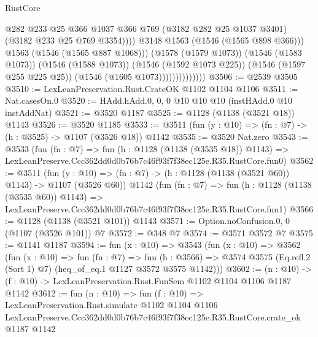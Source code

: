 \begin{lexlean}{RustCore}
\begin{coremodule}
                                      @282
                                      @233
                                      @25
                                      @366
                                      @1037
                                      @366
                                      @769
                                      (@3182 @282 @25 @1037 @3401)
                                      (@3182 @233 @25 @769 @3354))))
                                @3148
                                @1563
                                (@1546 (@1565 @898 @366)))
                              @1563
                              (@1546 (@1565 @887 @1068)))
                            (@1578 (@1579 @1073))
                            (@1546 (@1583 @1073))
                            (@1546 (@1588 @1073))
                            (@1546 (@1592 @1073 @225))
                            (@1546 (@1597 @255 @225 @25))
                            (@1546 (@1605 @1073))))))))))))))
@3506 := @2539 @3505
@3510 := LexLeanPreservation.Rust.CrateOK @1102 @1104 @1106
@3511 := Nat.casesOn.{0}
@3520 := HAdd.hAdd.{0, 0, 0} @10 @10 @10 (instHAdd.{0} @10 instAddNat)
@3521 := @3520 @1187
@3525 := @1128 (@1138 (@3521 @18)) @1143
@3526 := @3520 @1185
@3533 := @3511 (fun (y : @10) => (fn : @7) -> (h : @3525) -> @1107 (@3526 @18)) @1142
@3535 := @3520 Nat.zero
@3543 := @3533
    (fun (fn : @7) =>
    fun (h : @1128 (@1138 (@3535 @18)) @1143) =>
    LexLeanPreserve.Ccc362dd0d0b76b7c46f93f7f38ec125e.R35.RustCore.fun0)
@3562 := @3511
    (fun (y : @10) => (fn : @7) -> (h : @1128 (@1138 (@3521 @60)) @1143) -> @1107 (@3526 @60))
    @1142
    (fun (fn : @7) =>
    fun (h : @1128 (@1138 (@3535 @60)) @1143) =>
    LexLeanPreserve.Ccc362dd0d0b76b7c46f93f7f38ec125e.R35.RustCore.fun1)
@3566 := @1128 (@1138 (@3521 @101)) @1143
@3571 := Option.noConfusion.{0, 0} (@1107 (@3526 @101)) @7
@3572 := @348 @7
@3574 := @3571 @3572 @7
@3575 := @1141 @1187
@3594 := fun (x : @10) =>
  @3543
    (fun (x : @10) =>
    @3562
      (fun (x : @10) =>
      fun (fn : @7) =>
      fun (h : @3566) =>
      @3574 @3575 (Eq.refl.{2} (Sort 1) @7) (heq_of_eq.{1} @1127 @3572 @3575 @1142)))
@3602 := (n : @10) -> (f : @10) -> LexLeanPreservation.Rust.FunSem @1102 @1104 @1106 @1187 @1142
@3612 := fun (n : @10) =>
  fun (f : @10) =>
  LexLeanPreservation.Rust.simulate
    @1102
    @1104
    @1106
    LexLeanPreserve.Ccc362dd0d0b76b7c46f93f7f38ec125e.R35.RustCore.crate_ok
    @1187
    @1142
\end{coremodule}
\end{lexlean}
